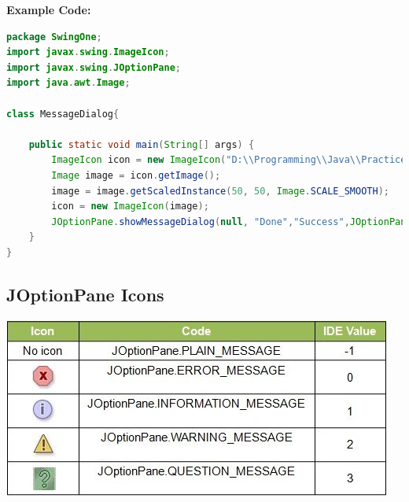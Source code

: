\newpage
\textbf{Example Code:}
\begin{lstlisting}[language=java]
package SwingOne;
import javax.swing.ImageIcon;
import javax.swing.JOptionPane;
import java.awt.Image;

class MessageDialog{
	
	public static void main(String[] args) {
		ImageIcon icon = new ImageIcon("D:\\Programming\\Java\\PracticeProject\\Swing\\Icons\\done.png");
		Image image = icon.getImage();
		image = image.getScaledInstance(50, 50, Image.SCALE_SMOOTH);
		icon = new ImageIcon(image);
		JOptionPane.showMessageDialog(null, "Done","Success",JOptionPane.DEFAULT_OPTION, icon);
	}
}
\end{lstlisting}


\subsection{JOptionPane Icons}
\begin{center}
\includegraphics[scale=0.8]{Figures/JOptionPane_Icons.jpg}
\end{center}


\newpage
